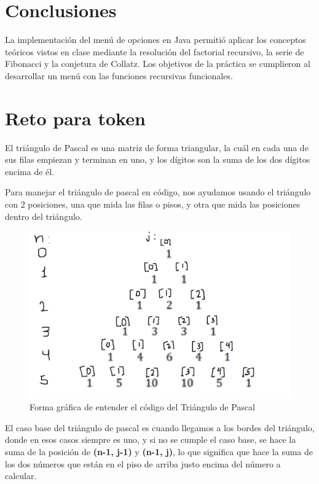 \documentclass[letterpaper,12pt]{article}
\begin{document}
\section{Conclusiones}


La implementación del menú de opciones en Java permitió aplicar los conceptos teóricos vistos en clase mediante la resolución del factorial recursivo, la serie de Fibonacci y la conjetura de Collatz. Los objetivos de la práctica se cumplieron al desarrollar un menú con las funciones recursivas funcionales.

\clearpage

\printbibliography

\clearpage

\section{Reto para token}
El triángulo de Pascal es una matriz de forma triangular, la cuál en cada una de sus filas empiezan y terminan en uno, y los dígitos son la suma de los dos dígitos encima de él.

Para manejar el triángulo de pascal en código, nos ayudamos usando el triángulo con 2 posiciones, una que mida las filas o pisos, y otra que mida las posiciones dentro del triángulo.

\begin{figure}[H]
    \centering
    \includegraphics[width=15cm]{Imagenes/ejemplo.png}
    \caption{\centering Forma gráfica de entender el código del Triángulo de Pascal}
\end{figure}

El caso base del triángulo de pascal es cuando llegamos a los bordes del triángulo, donde en esos casos siempre es uno, y si no se cumple el caso base, se hace la suma de la posición de \textbf{(n-1, j-1)} y \textbf{(n-1, j)}, lo que significa que hace la suma de los dos números que están en el piso de arriba justo encima del número a calcular.
\end{document}
